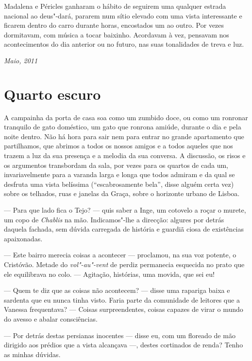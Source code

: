 Madalena e Péricles ganharam o hábito de seguirem uma qualquer estrada
nacional ao deus"-dará, pararem num sítio elevado com uma vista
interessante e ficarem dentro do carro durante horas, encostados um ao
outro. Por vezes dormitavam, com música a tocar baixinho. Acordavam à
vez, pensavam nos acontecimentos do dia anterior ou no futuro, nas suas
tonalidades de treva e luz.

\begin{flushright}
\emph{Maio, 2011}
\end{flushright}


\chapter{Quarto escuro}

A campainha da porta de casa soa como um zumbido doce, ou como um ronronar
tranquilo de gato doméstico, um gato que ronrona amiúde, durante o dia e
pela noite dentro. Não há hora para sair nem para entrar no grande
apartamento que partilhamos, que abrimos a todos os nossos amigos e a
todos aqueles que nos trazem a luz da sua presença e a melodia da sua
conversa. A discussão, os risos e os argumentos transbordam da sala,
por vezes para os quartos de cada um, invariavelmente para a varanda
larga e longa que todos admiram e da qual se desfruta uma vista
belíssima (``escabrosamente bela'', disse alguém certa vez) sobre os
telhados, ruas e janelas da Graça, sobre o horizonte urbano de Lisboa.

--- Para que lado fica o Tejo? --- quis saber a Inge, um cotovelo a roçar
  o murete, um copo de \emph{Chablis }na mão. Indicamos"-lhe a
  direcção: algures por detrás daquela fachada, sem dúvida carregada de
  história e guardiã ciosa de existências apaixonadas.

--- Este bairro merecia coisas a acontecer --- proclamou, na sua voz
  potente, o Cristóvão. Metade do \emph{vol"-au"-vent }de perdiz
  permanecia esquecida no prato que ele equilibrava no
colo. --- Agitação, histórias, uma movida, que sei eu!

--- Quem te diz que as coisas não acontecem? --- disse uma rapariga
baixa e sardenta que eu nunca tinha visto. Faria parte da comunidade de
leitores que a Vanessa frequentava? --- Coisas surpreendentes, coisas
capazes de virar o mundo do avesso e abalar consciências.

--- Por detrás destas persianas inocentes --- disse eu, com um floreado
de mão dirigido aos prédios que a vista alcançava ---, destes cortinados
de renda? Tenho as minhas dúvidas.

